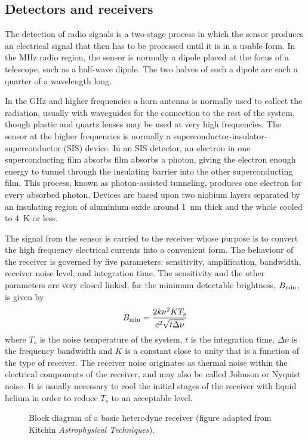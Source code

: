 \documentclass{article}
\begin{document}
\subsection{Detectors and receivers}

The detection of radio signals is a two-stage process in which the sensor
produces an electrical signal that then has to be processed until it is in
a usable form. In the MHz radio region, the sensor is normally a dipole 
placed at the focus of a telescope, such as a half-wave dipole. The two halves
of such a dipole are each a quarter of a wavelength long. 

In the GHz and higher frequencies a horn antenna is normally used to collect 
the radiation, usually with waveguides for the connection to the rest of the 
system, though plastic and quartz lenses may be used at very high frequencies.
The sensor at the higher frequencies is normally a 
superconductor-insulator-superconductor (SIS) device. In an SIS detector, an
electron in one superconducting film absorbs film absorbs a photon, giving the
electron enough energy to tunnel through the insulating barrier into the other
superconducting film. This process, known as photon-assisted tunneling, 
produces one electron for every absorbed photon. Devices are based upon two
niobium layers separated by an insulating region of aluminium oxide around
1~nm thick and the whole cooled to 4~K or less.

The signal from the sensor is carried to the receiver whose purpose is 
to convert the high frequency electrical currents into a convenient form.
The behaviour of the receiver is governed by five parameters: sensitivity,
amplification, bandwidth, receiver noise level, and integration time. The
sensitivity and the other parameters are very closed linked, for the minimum
detectable brightness, $B_{\rm min}$, is given by
\[
B_{\rm min}={2k\nu^2KT_s\over c^2\sqrt{t\Delta\nu}}
\]
where $T_s$ is the noise temperature of the system, $t$ is the integration 
time, $\Delta\nu$ is the frequency bandwidth and $K$ is a constant close to 
unity that is a function of the type of receiver. The receiver noise originates
as thermal noise within the electrical components of the receiver, and may also
be called Johnson or Nyquist noise. It is usually necessary to cool the initial
stages of the receiver with liquid helium in order to reduce $T_s$ to an 
acceptable level.


\begin{figure}[h]
  \centering  {}
  \caption{Block diagram of a basic heterodyne receiver (figure adapted from Kitchin {\it
Astrophysical Techniques}).}
  \label{fig:heterodyne}
\end{figure}
\end{document}
